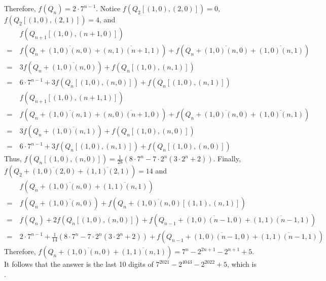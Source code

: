 \begin{solution}
	Therefore, $f(Q_n) = 2\cdot 7^{n-1}$. Notice $f(Q_2[(1,0),(2,0)]) = 0$, $f(Q_2[(1,0),(2,1)]) = 4$, and
	\begin{align*}
	&\ f(Q_{n+1}[(1,0),(n+1,0)])\\
	=&\ f\left(Q_n+\overline{(1,0)(n,0)}+\overline{(n,1)(n+1,1)}\right) + f\left(Q_n+\overline{(1,0)(n,0)}+\overline{(1,0)(n,1)}\right)\\
	=&\ 3f\left(Q_n+\overline{(1,0)(n,0)}\right) + f(Q_n[(1,0),(n,1)])\\
	=&\ 6\cdot 7^{n-1} + 3f(Q_n[(1,0),(n,0)]) + f(Q_n[(1,0),(n,1)])
	\end{align*}
	\begin{align*}
	&\ f(Q_{n+1}[(1,0),(n+1,1)])\\
	=&\ f\left(Q_n+\overline{(1,0)(n,1)}+\overline{(n,0)(n+1,0)}\right) + f\left(Q_n+\overline{(1,0)(n,0)}+\overline{(1,0)(n,1)}\right)\\
	=&\ 3f\left(Q_n+\overline{(1,0)(n,1)}\right) + f(Q_n[(1,0),(n,0)])\\
	=&\ 6\cdot 7^{n-1} + 3f(Q_n[(1,0),(n,1)]) + f(Q_n[(1,0),(n,0)])
	\end{align*}
	Thus, $f(Q_n[(1,0),(n,0)]) = \frac{1}{28} (8\cdot 7^n - 7\cdot 2^n (3\cdot 2^n + 2))$.
	Finally, $f\left(Q_2+\overline{(1,0)(2,0)}+\overline{(1,1)(2,1)}\right) = 14$ and
	\begin{align*}
	&\ f\left(Q_n+\overline{(1,0)(n,0)}+\overline{(1,1)(n,1)}\right)\\
	=&\ f\left(Q_n+\overline{(1,0)(n,0)}\right) + f\left(Q_n+\overline{(1,0)(n,0)}[(1,1),(n,1)]\right)\\
	=&\ f(Q_n) + 2f(Q_n[(1,0),(n,0)]) + f\left(Q_{n-1}+\overline{(1,0)(n-1,0)}+\overline{(1,1)(n-1,1)}\right)\\
	=&\ 2\cdot 7^{n-1} + \frac{1}{14} (8\cdot 7^n - 7\cdot 2^n (3\cdot 2^n + 2)) + f\left(Q_{n-1}+\overline{(1,0)(n-1,0)}+\overline{(1,1)(n-1,1)}\right)
	\end{align*}
	Therefore, $f\left(Q_n+\overline{(1,0)(n,0)}+\overline{(1,1)(n,1)}\right) = 7^n - 2^{2n+1} - 2^{n+1} + 5$. 
	It follows that the answer is the last 10 digits of $7^{2021} - 2^{4043} - 2^{2022} + 5$, which is .
\end{solution}\bigskip

